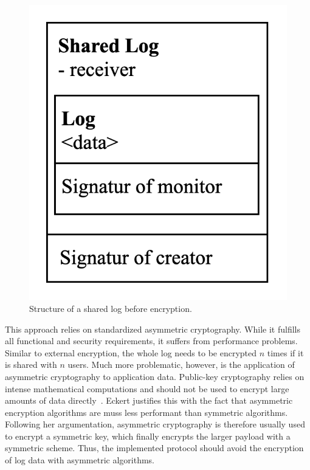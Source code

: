 \documentclass[../main.tex]{subfiles}
\begin{document}
\begin{figure}[ht]
    \includegraphics[scale=0.2]{../img/04/mutual_encryption.png}
    \centering
    \caption[Structure shared log]{Structure of a shared log before encryption.}
    \label{fig:mutual_encryption}
\end{figure}

This approach relies on standardized asymmetric cryptography.
While it fulfills all functional and security requirements, it suffers from performance problems.
Similar to external encryption, the whole log needs to be encrypted $n$ times if it is shared with $n$ users.
Much more problematic, however, is the application of asymmetric cryptography to application data.
Public-key cryptography relies on intense mathematical computations and should not be used to encrypt large amounts of data directly~\cite[340]{Eckert2018}.
Eckert justifies this with the fact that asymmetric encryption algorithms are muss less performant than symmetric algorithms.
Following her argumentation, asymmetric cryptography is therefore usually used to encrypt a symmetric key, which finally encrypts the larger payload with a symmetric scheme.
Thus, the implemented protocol should avoid the encryption of log data with asymmetric algorithms.
\end{document}
